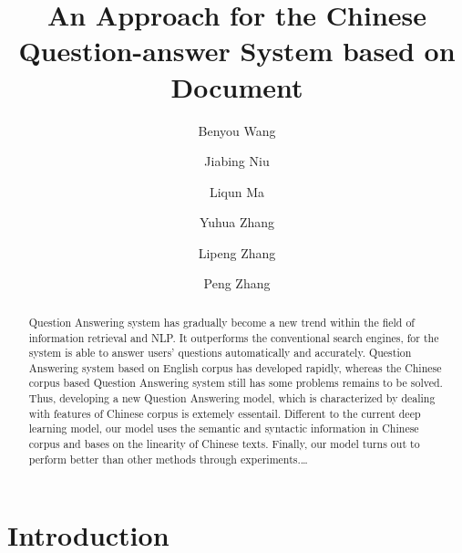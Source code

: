 \documentclass{llncs}
\begin{document}
\title{An Approach for the Chinese Question-answer System based on Document}
%
%
\author{Benyou Wang \and Jiabing Niu \and Liqun Ma \and Yuhua Zhang \and Lipeng Zhang
\and Peng Zhang}
%
%
%


\maketitle              %



\begin{abstract}
Question Answering system has gradually become a new trend within the field of information retrieval and NLP. It outperforms the conventional search engines, for the system is able to answer users’ questions automatically and accurately. Question Answering system based on English corpus has developed rapidly, whereas the Chinese corpus based Question Answering system still has some problems remains to be solved. Thus, developing a new Question Answering model, which is characterized by dealing with features of Chinese corpus is extemely essentail. Different to the current deep learning model, our model uses the semantic and syntactic information in Chinese corpus and bases on the linearity of Chinese texts. Finally, our model turns out to perform better than other methods through experiments.\dots
{}
\end{abstract}
%
\section{Introduction}
\end{document}
